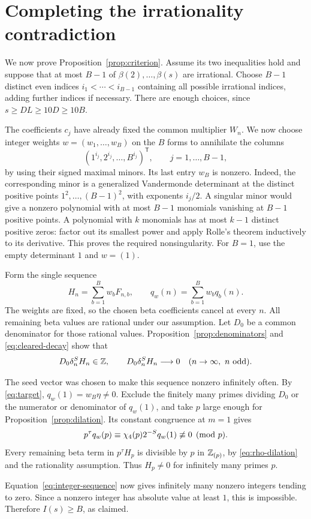 \section{Completing the irrationality contradiction}\label{sec:contradiction}

We now prove Proposition~\ref{prop:criterion}. Assume its two
inequalities hold and suppose that at most $B-1$ of
$\beta(2),\ldots,\beta(s)$ are irrational. Choose $B-1$ distinct
even indices $i_1<\cdots<i_{B-1}$ containing all possible
irrational indices, adding further indices if necessary. There
are enough choices, since $s\ge DL\ge10D\ge10B$.

The coefficients $c_j$ have already fixed the common multiplier
$W_n$. We now choose integer weights $w=(w_1,\ldots,w_B)$ on the
$B$ forms to annihilate the columns
\[
 (1^{i_j},2^{i_j},\ldots,B^{i_j})^{\mathsf T},
                  \qquad j=1,\ldots,B-1,
\]
by using their signed maximal minors. Its last entry $w_B$ is nonzero.
Indeed, the corresponding minor is a generalized Vandermonde
determinant at the distinct positive points
$1^2,\ldots,(B-1)^2$, with exponents $i_j/2$. A singular minor
would give a nonzero polynomial with at most $B-1$ monomials
vanishing at $B-1$ positive points. A polynomial with $k$ monomials
has at most $k-1$ distinct positive zeros: factor out its smallest
power and apply Rolle's theorem inductively to its derivative.
This proves the required nonsingularity. For $B=1$, use the empty
determinant $1$ and $w=(1)$.

Form the single sequence
\[
 H_n=\sum_{b=1}^B w_bF_{n,b},\qquad
 q_w(n)=\sum_{b=1}^B w_bq_b(n).
\]
The weights are fixed, so the chosen beta coefficients cancel at
every $n$. All remaining beta values are rational under our
assumption. Let $D_0$ be a common denominator for those rational
values. Proposition~\ref{prop:denominators} and
\eqref{eq:cleared-decay} show that
\begin{equation}\label{eq:integer-sequence}
 D_0\delta_n^S H_n\in\mathbb Z,\qquad
 D_0\delta_n^S H_n\longrightarrow0
          \quad(n\to\infty,\ n\text{ odd}).
\end{equation}

The seed vector was chosen to make this sequence nonzero infinitely
often. By \eqref{eq:target},
$q_w(1)=w_B\eta\ne0$. Exclude the finitely many primes dividing
$D_0$ or the numerator or denominator of $q_w(1)$, and take $p$
large enough for Proposition~\ref{prop:dilation}. Its constant
congruence at $m=1$ gives
\[
 p^\tau q_w(p)\equiv\chi_4(p)2^{-S}q_w(1)\not\equiv0\pmod p.
\]
Every remaining beta term in $p^\tau H_p$ is divisible by $p$ in
$\mathbb Z_{(p)}$, by \eqref{eq:rho-dilation} and the rationality assumption.
Thus $H_p\ne0$ for infinitely many primes $p$.

Equation~\eqref{eq:integer-sequence} now gives infinitely many
nonzero integers tending to zero. Since a nonzero integer has
absolute value at least $1$, this is impossible. Therefore
$I(s)\ge B$, as claimed.
